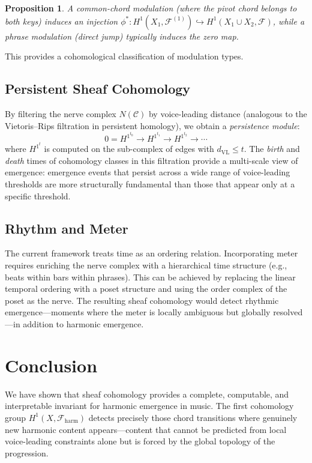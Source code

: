 \documentclass[12pt,a4paper]{article}
\newtheorem{proposition}[theorem]{Proposition}
\newcommand{\Hone}{H^{1}}
\newcommand{\sheaf}{\mathscr{F}}
\begin{document}
\begin{proposition}
  A \emph{common-chord modulation} (where the pivot chord belongs to both keys) induces an 
  injection $\phi^*\colon \Hone(X_1, \sheaf^{(1)}) \hookrightarrow \Hone(X_1 \cup X_2, \sheaf)$, 
  while a \emph{phrase modulation} (direct jump) typically induces the zero map.
\end{proposition}

This provides a cohomological classification of modulation types.

\subsection{Persistent Sheaf Cohomology}

By filtering the nerve complex $N(\mathcal{C})$ by voice-leading distance (analogous to 
the Vietoris--Rips filtration in persistent homology), we obtain a \emph{persistence module}:
\[
  0 = \Hone^{t_0} \to \Hone^{t_1} \to \Hone^{t_2} \to \cdots
\]
where $\Hone^{t}$ is computed on the sub-complex of edges with $d_{\mathrm{VL}} \leq t$. 
The \emph{birth} and \emph{death} times of cohomology classes in this filtration provide 
a multi-scale view of emergence: emergence events that persist across a wide range of 
voice-leading thresholds are more structurally fundamental than those that appear only 
at a specific threshold.

\subsection{Rhythm and Meter}

The current framework treats time as an ordering relation. Incorporating meter requires 
enriching the nerve complex with a hierarchical time structure (e.g., beats within bars 
within phrases). This can be achieved by replacing the linear temporal ordering with a 
poset structure and using the order complex of the poset as the nerve. The resulting 
sheaf cohomology would detect rhythmic emergence---moments where the meter is locally 
ambiguous but globally resolved---in addition to harmonic emergence.

\section{Conclusion}\label{sec:conclusion}

We have shown that sheaf cohomology provides a complete, computable, and interpretable 
invariant for harmonic emergence in music. The first cohomology group $\Hone(X, \sheaf_{\mathrm{harm}})$ 
detects precisely those chord transitions where genuinely new harmonic content appears---content 
that cannot be predicted from local voice-leading constraints alone but is forced by the 
global topology of the progression.
\end{document}
